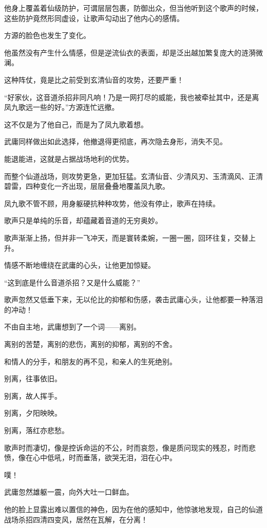 \begin{this_body}
他身上覆盖着仙级防护，可谓层层包裹，防御出众，但当他听到这个歌声的时候，这些防护竟然形同虚设，让歌声勾动出了他内心的感情。

方源的脸色也发生了变化。

他虽然没有产生什么情感，但是逆流仙衣的表面，却是泛出越加繁复庞大的涟漪微澜。

这种阵仗，竟是比之前受到玄清仙音的攻势，还要严重！

“好家伙，这音道杀招非同凡响！乃是一网打尽的威能，我也被牵扯其中，还是离凤九歌远一些的好。”方源连忙远撤。

这不仅是为了他自己，而是为了凤九歌着想。

武庸同样做出如此选择，他撤退得更彻底，再次隐去身形，消失不见。

能退能进，这就是占据战场地利的优势。

而整个仙道战场，则攻势更急，更加狂猛。玄清仙音、少清风刃、玉清滴风、正清碧雷，四种变化一齐出现，层层叠叠地覆盖凤九歌。

凤九歌不管不顾，用身躯硬抗种种攻势，他没有停止，歌声在持续。

歌声只是单纯的乐音，却蕴藏着音道的无穷奥妙。

歌声渐渐上扬，但并非一飞冲天，而是寰转柔婉，一圈一圈，回环往复，交替上升。

情感不断地缠绕在武庸的心头，让他更加惊疑。

“这到底是什么音道杀招？又是什么威能？”

歌声忽然又低垂下来，无以伦比的抑郁和伤感，袭击武庸心头，让他都要一种落泪的冲动！

不由自主地，武庸想到了一个词——离别。

离别的苦楚，离别的悲伤，离别的抑郁，离别的不舍。

和情人的分手，和朋友的再不见，和亲人的生死绝别。

别离，往事依旧。

别离，故人挥手。

别离，夕阳映映。

别离，落红亦悲愁。

歌声时而凄切，像是控诉命运的不公，时而哀怨，像是质问现实的残忍，时而悲愤，像在心中低吼，时而垂落，欲哭无泪，泪在心中。

噗！

武庸忽然雄躯一震，向外大吐一口鲜血。

他的脸上显露出难以置信的神色，因为在他的感知中，他惊骇地发现，自己的仙道战场杀招四清四变风，居然在瓦解，在分离！


\end{this_body}
